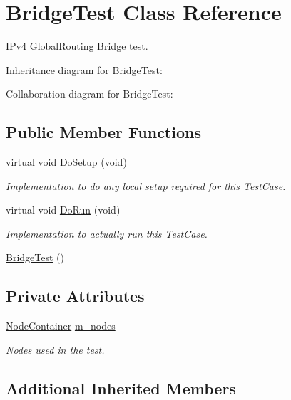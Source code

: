 \hypertarget{classBridgeTest}{}\section{Bridge\+Test Class Reference}
\label{classBridgeTest}


I\+Pv4 Global\+Routing Bridge test.  




Inheritance diagram for Bridge\+Test\+:


Collaboration diagram for Bridge\+Test\+:
\subsection*{Public Member Functions}
\begin{DoxyCompactItemize}
\item 
virtual void \hyperlink{classBridgeTest_a4d88ad6e9248541478917f836cf52b78}{Do\+Setup} (void)
\begin{DoxyCompactList}\small\item\em Implementation to do any local setup required for this Test\+Case. \end{DoxyCompactList}\item 
virtual void \hyperlink{classBridgeTest_af5aa91b39e8242e01f3a46cbfbdb9c35}{Do\+Run} (void)
\begin{DoxyCompactList}\small\item\em Implementation to actually run this Test\+Case. \end{DoxyCompactList}\item 
\hyperlink{classBridgeTest_a19f6a29a926206209abbddc872d06ea4}{Bridge\+Test} ()
\end{DoxyCompactItemize}
\subsection*{Private Attributes}
\begin{DoxyCompactItemize}
\item 
\hyperlink{classns3_1_1NodeContainer}{Node\+Container} \hyperlink{classBridgeTest_af539673ded293faf900a2202eeb0dbb0}{m\+\_\+nodes}
\begin{DoxyCompactList}\small\item\em Nodes used in the test. \end{DoxyCompactList}\end{DoxyCompactItemize}
\subsection*{Additional Inherited Members}


